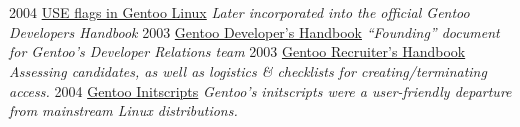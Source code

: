\documentclass[]{friggeri-cv} %
\begin{document}
\section{{} {} {\normalsize {}~~}}
\begin{entrylist}
\entry
{2004}
{\href{http://www.gentoo.org/doc/en/handbook/handbook-x86.xml?part=2&chap=2}{USE flags in Gentoo Linux}}
{}
{\emph{Later incorporated into the official \textup{Gentoo Developers Handbook}}}
\entry
{2003}
{\href{http://www.gentoo.org/proj/en/devrel/handbook/handbook.xml}{Gentoo Developer's Handbook}}
{}
{\emph{``Founding'' document for Gentoo's Developer Relations team}}
\entry
{2003}
{\href{http://www.gentoo.org/proj/en/devrel/recruiters/}{Gentoo Recruiter's Handbook}}
{}
{\emph{Assessing candidates, as well as logistics \& checklists for creating/terminating access.}}
\entry
{2004}
{\href{http://www.gentoo.org/doc/en/handbook/handbook-x86.xml?part=2&chap=4}{Gentoo Initscripts}}
{}
{\emph{Gentoo's initscripts were a user-friendly departure from mainstream Linux distributions.}}
\end{entrylist}
\end{document}
